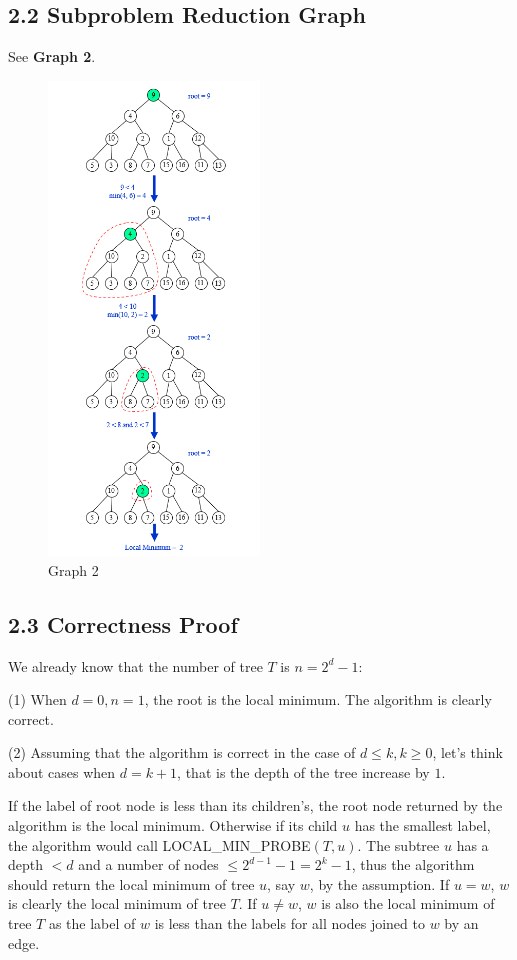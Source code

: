 \documentclass[UTF8]{ctexart}
\begin{document}
\subsection*{2.2 Subproblem Reduction Graph} 
See \textbf{Graph 2}.
\begin{figure} [htbp]
	\centering
	\caption*{Graph 2}
	\includegraphics[width=0.5\textwidth]{figs/2.png}
\end{figure}

\subsection*{2.3 Correctness Proof} 
We already know that the number of tree $T$ is $n = 2^d-1$:

(1) When $d = 0, n = 1$, the root is the local minimum. The algorithm is clearly correct.

(2) Assuming that the algorithm is correct in the case of $d \leq k , k \geq 0$, let's think about cases when $ d = k + 1$, 
that is the depth of the tree increase by $1$.

If the label of root node is less than its children's, the root node returned by the algorithm is the local minimum.
Otherwise if its child $u$ has the smallest label, the algorithm would call LOCAL\_MIN\_PROBE$(T, u)$. The subtree $u$ 
has a depth $ < d$ and a number of nodes $\leq 2^{d-1}-1 = 2^k-1$, thus the algorithm should return the local minimum of tree $u$, say $w$, by the assumption.
If $u = w$, $w$ is clearly the local minimum of tree $T$. If $u \neq w$, $w$ is also the local minimum of tree $T$ as 
the label of $w$ is less than the labels for all nodes joined to $w$ by an edge.
\end{document}
